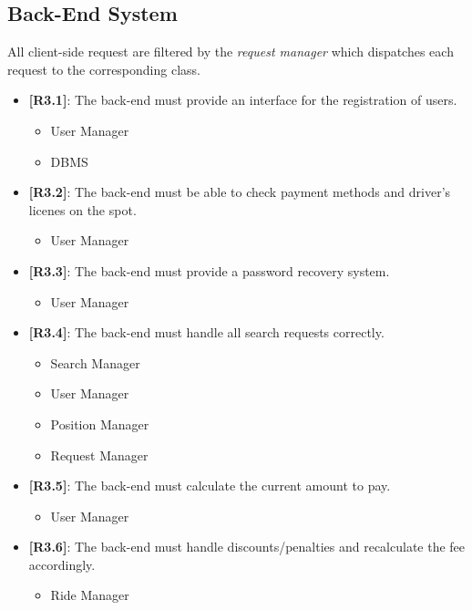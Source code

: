 \subsection{Back-End System}
All client-side request are filtered by the \emph{request manager} which dispatches each request to the corresponding class.\\
\begin{itemize}
	\item {\textbf{[R3.1]}}: The back-end must provide an interface for the registration of users.
	\begin{itemize}
	\item User Manager
	\item DBMS\\
	\end{itemize}

	\item {\textbf{[R3.2]}}: The back-end must be able to check payment methods and driver’s licenes on the spot.
	\begin{itemize}
	\item User Manager\\
	\end{itemize}
	
	\item {\textbf{[R3.3]}}: The back-end must provide a password 			recovery system.
	\begin{itemize}
	\item User Manager\\
	\end{itemize}
	
	\item {\textbf{[R3.4]}}: The back-end must handle all search requests correctly.
	\begin{itemize}
	\item Search Manager
	\item User Manager
	\item Position Manager
	\item Request Manager
	\end{itemize}
	
	\item {\textbf{[R3.5]}}: The back-end must calculate the current amount to pay.
	\begin{itemize}
	\item User Manager\\
	\end{itemize}
	
	\item {\textbf{[R3.6]}}: The back-end must handle discounts/penalties and recalculate the fee accordingly.
	\begin{itemize}
	\item Ride Manager\\
	\end{itemize}


\end{itemize}
